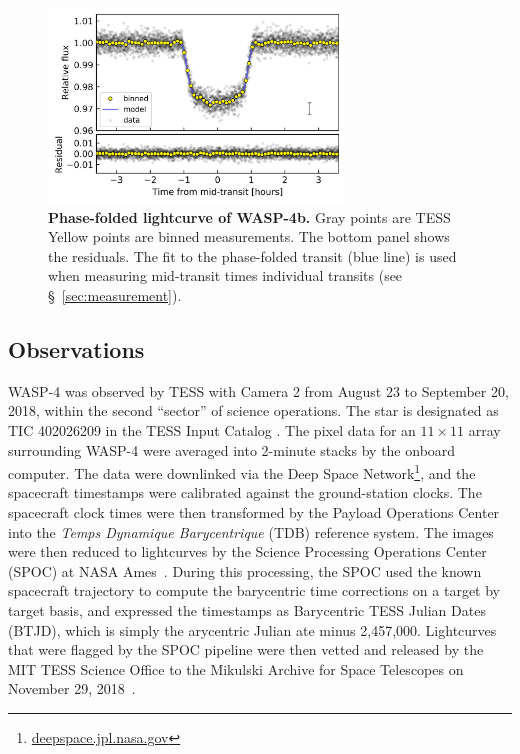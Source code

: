 \documentclass[12pt,twocolumn,tighten]{aastex62}
\begin{document}
\begin{figure}[t]
    \begin{center}
        \includegraphics[width=0.7\textwidth]{f2.png}
    \end{center}
    \vspace{-0.7cm}
    \caption{
        {\bf Phase-folded lightcurve of WASP-4b.} Gray points are
        TESS  
        Yellow points are binned measurements.  The bottom
        panel shows the residuals.  The fit to the phase-folded
        transit (blue line) is used when measuring mid-transit times
         individual transits (see 
        \S~\ref{sec:measurement}).
        \label{fig:phasefold}
    }
\end{figure}

\subsection{Observations}

WASP-4 was observed by TESS with Camera 2 from August 23 to September
20, 2018, within the second ``sector'' of science operations.  The
star is designated as TIC 402026209 in the TESS Input Catalog
\citep{stassun_TIC_2018}.  The pixel data for an $11\times11$ array
surrounding WASP-4 were averaged into 2-minute stacks by the onboard
computer.  The data were downlinked via the Deep Space
Network\footnote{\url{deepspace.jpl.nasa.gov}}, and the
spacecraft timestamps were calibrated against the ground-station
clocks.  The spacecraft clock times were then transformed by the
Payload Operations Center into the {\it Temps Dynamique Barycentrique}
(TDB) reference system.  The images were then reduced to lightcurves
by the Science Processing Operations Center (SPOC) at NASA
Ames~\citep{jenkins_tess_2016}.  During this processing, the SPOC used
the known spacecraft trajectory to compute the barycentric time
corrections on a target by target basis, and expressed the timestamps
as Barycentric TESS Julian Dates (BTJD), which is simply the
arycentric Julian ate minus
2{,}457{,}000.  Lightcurves that were flagged by the SPOC pipeline  were then vetted and released by the MIT TESS
Science Office to the Mikulski Archive for Space Telescopes on
November 29, 2018~\citep{ricker_tess_alerts_2018}.
\end{document}
